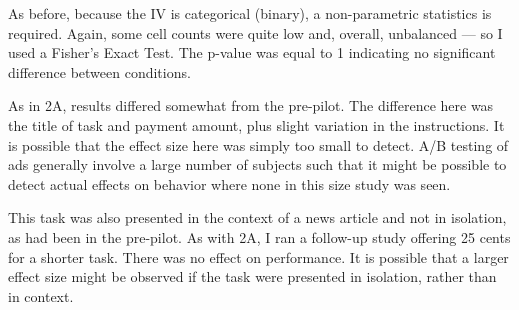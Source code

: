 As before, because the IV is categorical (binary), a non-parametric statistics is required. Again, some cell counts were quite low and, overall, unbalanced --- so I used a Fisher's Exact Test. The p-value was equal to 1 indicating no significant difference between conditions.

As in 2A, results differed somewhat from the pre-pilot. The difference here was the title of task and payment amount, plus slight variation in the instructions. It is possible that the effect size here was simply too small to detect. A\slash B testing of ads generally involve a large number of subjects such that it might be possible to detect actual effects on behavior where none in this size study was seen. 

This task was also presented in the context of a news article and not in isolation, as had been in the pre-pilot.    As with 2A, I ran a follow-up study offering 25 cents for a shorter task. There was no effect on performance. It is possible that a larger effect size might be observed if the task were presented in isolation, rather than in context.
